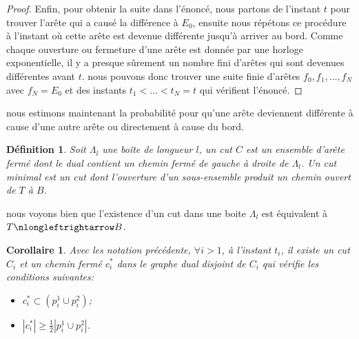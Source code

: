 \documentclass[titlepage,a4paper,12pt]{article}
\newcounter{def}
\newcounter{cor}
\newtheorem{cut}[def]{Définition}
\newtheorem{bcut}[cor]{Corollaire}
\begin{document}
\begin{proof}
Enfin, pour obtenir la suite dans l'énoncé, nous partons de l'instant $t$ pour trouver l'arête qui a causé la différence à $E_0$, ensuite nous répétons ce procédure à l'instant où cette arête est devenue différente jusqu'à arriver au bord. Comme chaque ouverture ou fermeture d'une arête est donnée par une horloge exponentielle, il y a presque sûrement un nombre fini d'arêtes qui sont devenues différentes avant $t$. nous pouvons donc trouver une suite finie d'arêtes $f_0,f_1,\dots, f_N$ avec $f_N = E_0$ et des instants $t_1<\dots< t_N = t$ qui vérifient l'énoncé.
\end{proof}

nous estimons maintenant la probabilité pour qu'une arête deviennent différente à cause d'une autre arête ou directement à cause du bord. 

\begin{cut}
Soit $\Lambda_l$ une boîte de longueur $l$, un cut $C$ est un ensemble d'arête fermé dont le dual contient un chemin fermé de gauche à droite de $\Lambda_l$. Un cut minimal est un cut dont l'ouverture d'un sous-ensemble produit un chemin ouvert de $T$ à $B$.
\end{cut}

nous voyons bien que l'existence d'un cut dans une boite $\Lambda_l$ est équivalent à $T\nlongleftrightarrow B$.

\begin{bcut}
Avec les notation précédente, $\forall i>1$, à l'instant $t_i$, il existe un cut $C_i$ et un chemin fermé $c_i^*$ dans le graphe dual disjoint de $C_i$ qui vérifie les conditions suivantes:
\begin{itemize}
\item $c^*_i \subset (p_i^1\cup p_i^2)$;
\item $|c^*_i| \geqslant \frac{1}{2}|p_i^1\cup p_i^2|$.
\end{itemize}
\end{bcut}
\end{document}
